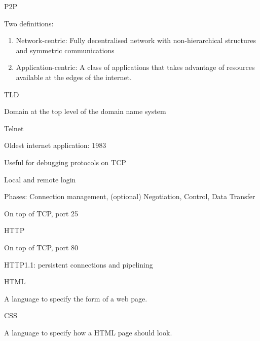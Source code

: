 \documentclass[main.tex]{subfiles}
\begin{document}
\small


\begin{card}{P2P}
\item Two definitions:
    \begin{enumerate}
        \item Network-centric: Fully decentralised network with non-hierarchical structures and symmetric communications
        \item Application-centric: A class of applications that takes advantage of resources available at the edges of the internet.
    \end{enumerate}
\end{card}

\begin{card}{TLD}
\item Domain at the top level of the domain name system
\end{card}

\begin{card}{Telnet}
\item Oldest internet application: 1983
\item Useful for debugging protocols on TCP
\item Local and remote login
\item Phases: Connection management, (optional) Negotiation, Control, Data Transfer
\item On top of TCP, port 25
\end{card}

\begin{card}{HTTP}
\item On top of TCP, port 80
\item HTTP1.1: persistent connections and pipelining
\end{card}
 
\begin{card}{HTML}
\item A language to specify the form of a web page.
\end{card}

\begin{card}{CSS}
\item A language to specify how a HTML page should look.
\end{card}

\end{document}
